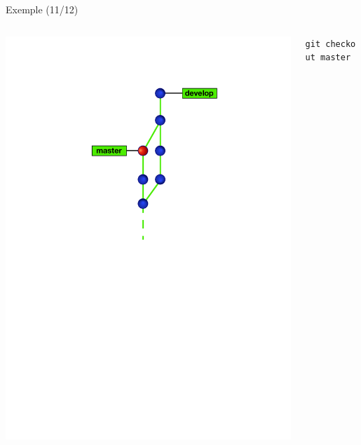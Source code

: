 \begin{frame}[fragile]{%
\protect\hypertarget{exemple-1112}{%
Exemple (11/12)}}

\begin{columns}[T]
\begin{column}{0.40\textwidth}
\includegraphics[width=1\textwidth]{images/branch11.pdf}
\end{column}

\begin{column}{0.60\textwidth}
\texttt{git\ checkout\ master}
\end{column}
\end{columns}

\end{frame}

